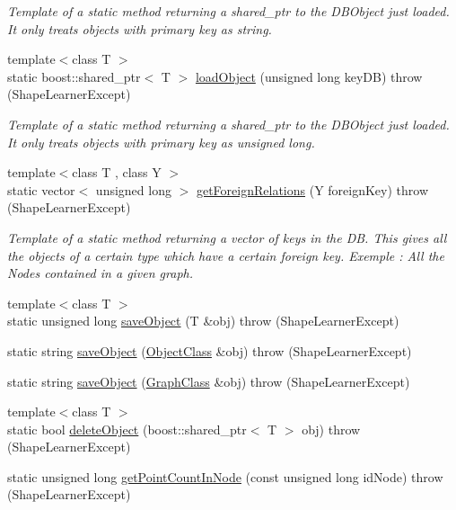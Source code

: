 \begin{DoxyCompactItemize}
\begin{DoxyCompactList}\small\item\em Template of a static method returning a shared\+\_\+ptr to the D\+B\+Object just loaded. It only treats objects with primary key as string. \end{DoxyCompactList}\item 
{\footnotesize template$<$class T $>$ }\\static boost\+::shared\+\_\+ptr$<$ T $>$ \hyperlink{class_database_manager_1_1_interface_a6cd7cdc0e461f6d196b07870f6a888d2}{load\+Object} (unsigned long key\+D\+B)  throw (\+Shape\+Learner\+Except)
\begin{DoxyCompactList}\small\item\em Template of a static method returning a shared\+\_\+ptr to the D\+B\+Object just loaded. It only treats objects with primary key as unsigned long. \end{DoxyCompactList}\item 
{\footnotesize template$<$class T , class Y $>$ }\\static vector$<$ unsigned long $>$ \hyperlink{class_database_manager_1_1_interface_a68b9650bd895d8605b8cdfa8fe959c16}{get\+Foreign\+Relations} (Y foreign\+Key)  throw (\+Shape\+Learner\+Except)
\begin{DoxyCompactList}\small\item\em Template of a static method returning a vector of keys in the D\+B. This gives all the objects of a certain type which have a certain foreign key. Exemple \+: All the Nodes contained in a given graph. \end{DoxyCompactList}\item 
{\footnotesize template$<$class T $>$ }\\static unsigned long \hyperlink{class_database_manager_1_1_interface_a84317b000eff828cbfcba60afbc9f62c}{save\+Object} (T \&obj)  throw (\+Shape\+Learner\+Except)
\item 
static string \hyperlink{class_database_manager_1_1_interface_a7eb793644e5a4e4aeb0dc8fd26d03843}{save\+Object} (\hyperlink{class_object_class}{Object\+Class} \&obj)  throw (\+Shape\+Learner\+Except)
\item 
static string \hyperlink{class_database_manager_1_1_interface_a63349ca054e506b27750d2ff565ea129}{save\+Object} (\hyperlink{class_graph_class}{Graph\+Class} \&obj)  throw (\+Shape\+Learner\+Except)
\item 
{\footnotesize template$<$class T $>$ }\\static bool \hyperlink{class_database_manager_1_1_interface_a1654237cd56dd78bae011275bdb444f7}{delete\+Object} (boost\+::shared\+\_\+ptr$<$ T $>$ obj)  throw (\+Shape\+Learner\+Except)
\item 
static unsigned long \hyperlink{class_database_manager_1_1_interface_a444746b545ff92b1ff602d2c8a33bab1}{get\+Point\+Count\+In\+Node} (const unsigned long id\+Node)  throw (\+Shape\+Learner\+Except)
\end{DoxyCompactItemize}
